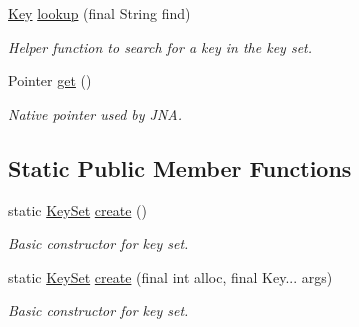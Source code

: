\begin{DoxyCompactItemize}
\mbox{\hyperlink{classorg_1_1libelektra_1_1Key}{Key}} \mbox{\hyperlink{classorg_1_1libelektra_1_1KeySet_a69921726091c9a775bb8ece1f1e3a858}{lookup}} (final String find)
\begin{DoxyCompactList}\small\item\em Helper function to search for a key in the key set. \end{DoxyCompactList}\item 
Pointer \mbox{\hyperlink{classorg_1_1libelektra_1_1KeySet_abf3f028c9c3b88a47aa9d67a5c8e95da}{get}} ()
\begin{DoxyCompactList}\small\item\em Native pointer used by J\+NA. \end{DoxyCompactList}\end{DoxyCompactItemize}
\subsection*{Static Public Member Functions}
\begin{DoxyCompactItemize}
\item 
static \mbox{\hyperlink{classorg_1_1libelektra_1_1KeySet}{Key\+Set}} \mbox{\hyperlink{classorg_1_1libelektra_1_1KeySet_ac0ba4b88bef5e731b586f4ca63b9ab7f}{create}} ()
\begin{DoxyCompactList}\small\item\em Basic constructor for key set. \end{DoxyCompactList}\item 
static \mbox{\hyperlink{classorg_1_1libelektra_1_1KeySet}{Key\+Set}} \mbox{\hyperlink{classorg_1_1libelektra_1_1KeySet_a441d0e45a150a6fd5f75be00ec42338d}{create}} (final int alloc, final Key... args)
\begin{DoxyCompactList}\small\item\em Basic constructor for key set. \end{DoxyCompactList}\end{DoxyCompactItemize}
